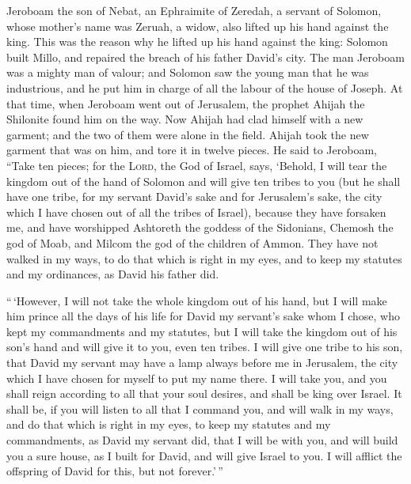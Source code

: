  Jeroboam the son of Nebat, an Ephraimite of Zeredah, a
servant of Solomon, whose mother's name was Zeruah, a widow, also lifted
up his hand against the king.  This was the reason why he
lifted up his hand against the king: Solomon built Millo, and repaired
the breach of his father David's city.  The man Jeroboam
was a mighty man of valour; and Solomon saw the young man that he was
industrious, and he put him in charge of all the labour of the house of
Joseph.  At that time, when Jeroboam went out of
Jerusalem, the prophet Ahijah the Shilonite found him on the way. Now
Ahijah had clad himself with a new garment; and the two of them were
alone in the field.  Ahijah took the new garment that was
on him, and tore it in twelve pieces.  He said to
Jeroboam, ``Take ten pieces; for the \textsc{Lord}, the God of Israel,
says, `Behold, I will tear the kingdom out of the hand of Solomon and
will give ten tribes to you  (but he shall have one
tribe, for my servant David's sake and for Jerusalem's sake, the city
which I have chosen out of all the tribes of Israel), 
because they have forsaken me, and have worshipped Ashtoreth the goddess
of the Sidonians, Chemosh the god of Moab, and Milcom the god of the
children of Ammon. They have not walked in my ways, to do that which is
right in my eyes, and to keep my statutes and my ordinances, as David
his father did.

 ``\,`However, I will not take the whole kingdom out of
his hand, but I will make him prince all the days of his life for David
my servant's sake whom I chose, who kept my commandments and my
statutes,  but I will take the kingdom out of his son's
hand and will give it to you, even ten tribes.  I will
give one tribe to his son, that David my servant may have a lamp always
before me in Jerusalem, the city which I have chosen for myself to put
my name there.  I will take you, and you shall reign
according to all that your soul desires, and shall be king over Israel.
 It shall be, if you will listen to all that I command
you, and will walk in my ways, and do that which is right in my eyes, to
keep my statutes and my commandments, as David my servant did, that I
will be with you, and will build you a sure house, as I built for David,
and will give Israel to you.  I will afflict the
offspring of David for this, but not forever.'\,''

